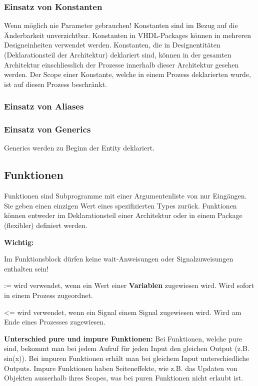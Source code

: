 \subsubsection{Einsatz von Konstanten}
Wenn möglich nie Parameter gebrauchen! Konstanten sind im Bezug auf die Änderbarkeit unverzichtbar. Konstanten in VHDL-Packages können in mehreren Designeinheiten verwendet werden. Konstanten, die in Designentitäten (Deklarationsteil der Architektur) deklariert sind, können in der gesamten Architektur einschliesslich der Prozesse innerhalb dieser Architektur gesehen werden. Der Scope einer Konstante, welche in einem Prozess deklarierten wurde, ist auf diesen Prozess beschränkt.

\subsubsection{Einsatz von Aliases}

\subsubsection{Einsatz von Generics}
Generics werden zu Beginn der Entity deklariert.


\subsection{Funktionen}
Funktionen sind Subprogramme mit einer Argumentenliste von nur Eingängen. Sie geben einen einzigen Wert eines spezifizierten Types zurück. Funktionen können entweder im Deklarationsteil einer Architektur oder in einem Package (flexibler) definiert werden.

\textbf{Wichtig:}
\begin{compactitem}
    \item Im Funktionsblock dürfen keine wait-Anweisungen oder Signalzuweisungen enthalten sein!
    \item := wird verwendet, wenn ein Wert einer \textbf{Variablen} zugewiesen wird. Wird sofort in einem Prozess zugeordnet.
    \item \textless= wird verwendet, wenn ein Signal einem Signal zugewiesen wird. Wird am Ende eines Prozesses zugewiesen.
\end{compactitem}
\textbf{Unterschied pure und impure Funktionen:} Bei Funktionen, welche pure sind, bekommt man bei jedem Aufruf für jeden Input den gleichen Output (z.B. sin(x)). Bei impuren Funktionen erhält man bei gleichem Input unterschiedliche Outputs. Impure Funktionen haben Seiteneffekte, wie z.B. das Updaten von Objekten ausserhalb ihres Scopes, was bei puren Funktionen nicht erlaubt ist.



